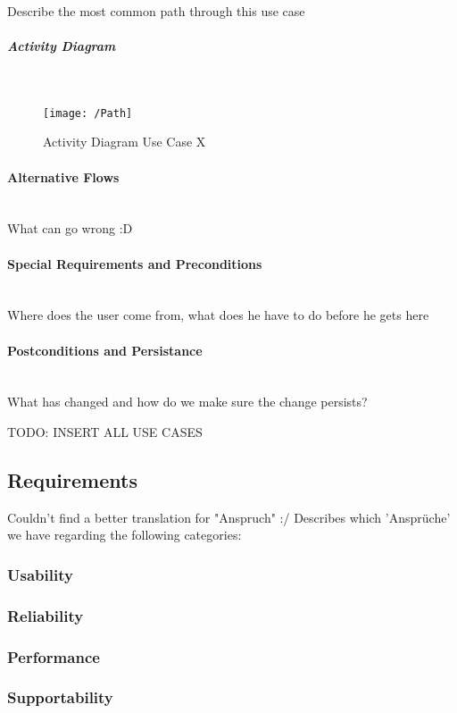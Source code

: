 Describe the most common path through this use case

\subparagraph{Activity Diagram}\mbox{}\\
\begin{figure}[Activity Diagram]
	\centering
	\texttt{[image: /Path]}
	\caption{Activity Diagram Use Case X}
	\label{fig:activityDiagramX}
\end{figure}

\paragraph{Alternative Flows}\mbox{}\\
What can go wrong :D

\paragraph{Special Requirements and Preconditions}\mbox{}\\
Where does the user come from, what does he have to do before he gets here

\paragraph{Postconditions and Persistance}\mbox{}\\
What has changed and how do we make sure the change persists?

TODO: INSERT ALL USE CASES

\subsection{Requirements}
\label{sec:domainBc}
Couldn't find a better translation for "Anspruch" :/
Describes which 'Ansprüche' we have regarding the following categories:
\subsubsection{Usability}
\label{sec:domainBca}
\subsubsection{Reliability}
\label{sec:domainBcb}
\subsubsection{Performance}
\label{sec:domainBcc}
\subsubsection{Supportability}
\label{sec:domainBcd}

